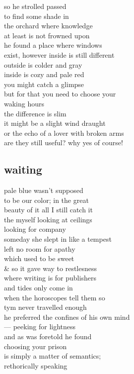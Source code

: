 \documentclass{article}
\begin{document}
so he strolled passed\\
to find some shade in\\
the orchard where knowledge\\
at least is not frowned upon\\
he found a place where windows\\
exist, however inside is still different\\
outside is colder and gray\\
inside is cozy and pale red\\
you might catch a glimpse\\
but for that you need to choose your\\
waking hours\\

the difference is slim\\
it might be a slight wind draught\\
or the echo of a lover with broken arms\\
are they still useful? why yes of course!\\
\clearpage
\subsection{waiting}

pale blue wasn't supposed\\
to be our color; in the great\\
beauty of it all I still catch it\\
the myself looking at ceilings\\
looking for company\\

someday she slept  in like a tempest\\
left no room for apathy\\
which used to be sweet\\
\& so it gave way to restlesness\\
where writing is for publishers\\
and tides only come in\\
when the horoscopes tell them so\\

tym never travelled enough\\
he preferred the confines of his own mind\\
--- peeking for lightness\\
and as was foretold he found\\
choosing your prison\\
is simply a matter of semantics; \\
rethorically speaking
\clearpage
\end{document}

